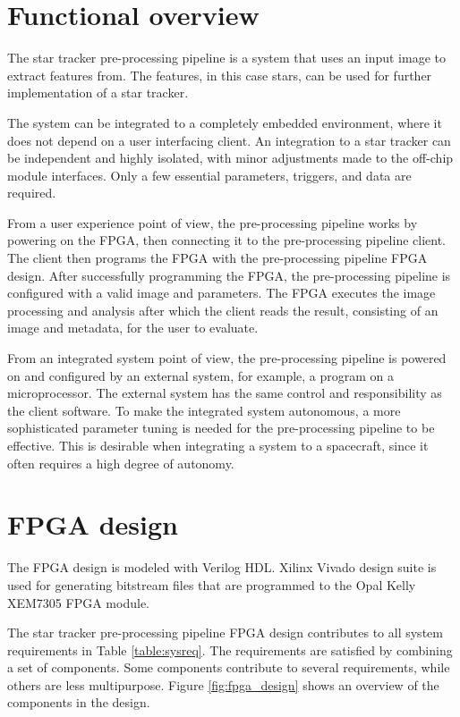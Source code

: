 \documentclass[12pt]{report}
\begin{document}
\section{Functional overview}
The star tracker pre-processing pipeline is a system that uses an input image to extract features from. The features, in this case stars, can be used for further implementation of a star tracker. %
\par
The system can be integrated to a completely embedded environment, where it does not depend on a user interfacing client. 
An integration to a star tracker can be independent and highly isolated, with minor adjustments made to the off-chip module interfaces. Only a few essential parameters, triggers, and data are required.  
\par
From a user experience point of view, the pre-processing pipeline works by powering on the FPGA, then connecting it to the pre-processing pipeline client. The client then programs the FPGA with the pre-processing pipeline FPGA design. After successfully programming the FPGA, the pre-processing pipeline is configured with a valid image and parameters. The FPGA executes the image processing and analysis after which the client reads the result, consisting of an image and metadata, for the user to evaluate.
\par
From an integrated system point of view, the pre-processing pipeline is powered on and configured by an external system, for example, a program on a microprocessor. The external system has the same control and responsibility as the client software. To make the integrated system autonomous, a more sophisticated parameter tuning is needed for the pre-processing pipeline to be effective. This is desirable when integrating a system to a spacecraft, since it often requires a high degree of autonomy.

\section{FPGA design}
The FPGA design is modeled with Verilog HDL. Xilinx Vivado design suite is used for generating bitstream files that are programmed to the Opal Kelly XEM7305 FPGA module.
\par
The star tracker pre-processing pipeline FPGA design contributes to all system requirements in Table \ref*{table:sysreq}. The requirements are satisfied by combining a set of components. Some components contribute to several requirements, while others are less multipurpose. Figure \ref*{fig:fpga_design} shows an overview of the components in the design.
\end{document}
